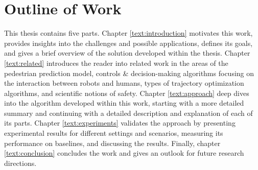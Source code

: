 \section{Outline of Work}
\label{text:introduction/outline}
This thesis contains five parts. Chapter \ref{text:introduction} motivates this work, provides insights into the challenges and possible applications, defines its goals, and gives a brief overview of the solution developed within the thesis. Chapter \ref{text:related} introduces the reader into related work in the areas of the pedestrian prediction model, controls \& decision-making algorithms focusing on the interaction between robots and humans, types of trajectory optimization algorithms, and scientific notions of safety. Chapter \ref{text:approach} deep dives into the algorithm developed within this work, starting with a more detailed summary and continuing with a detailed description and explanation of each of its parts. Chapter \ref{text:experiments} validates the approach by presenting experimental results for different settings and scenarios, measuring its performance on baselines, and discussing the results. Finally, chapter \ref{text:conclusion} concludes the work and gives an outlook for future research directions.
